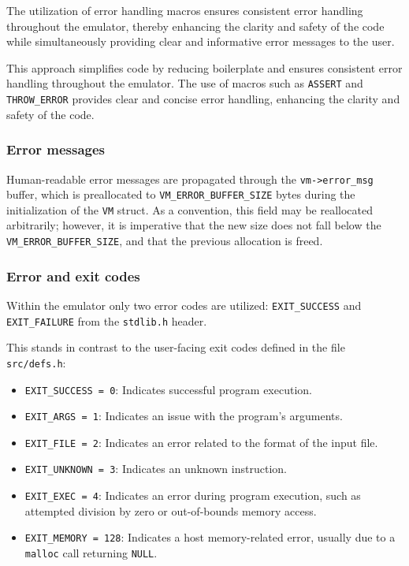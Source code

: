 \documentclass[10pt,a4paper,final]{article}
\newcommand{\code}[1]{\texttt{#1}}
\begin{document}
The utilization of error handling macros ensures consistent error handling
throughout the emulator, thereby enhancing the clarity and safety of the code
while simultaneously providing clear and informative error messages to the user.

This approach simplifies code by reducing boilerplate and ensures consistent
error handling throughout the emulator. The use of macros such as \code{ASSERT}
and \code{THROW_ERROR} provides clear and concise error handling, enhancing the
clarity and safety of the code.

\subsubsection{Error messages}
\label{sec:errormessages}

Human-readable error messages are propagated through the \code{vm->error_msg}
buffer, which is preallocated to \code{VM_ERROR_BUFFER_SIZE} bytes during the
initialization of the \code{VM} struct. As a convention, this field may be
reallocated arbitrarily; however, it is imperative that the new size does not
fall below the \code{VM_ERROR_BUFFER_SIZE}, and that the previous allocation is
freed.

\subsubsection{Error and exit codes}
\label{sec:errorcodes}

Within the emulator only two error codes are utilized: \code{EXIT_SUCCESS} and
\code{EXIT_FAILURE} from the \code{stdlib.h} header.

This stands in contrast to the user-facing exit codes defined in the file
\code{src/defs.h}:

\begin{itemize}
  \item \code{EXIT_SUCCESS = 0}: Indicates successful program execution.
  \item \code{EXIT_ARGS = 1}: Indicates an issue with the program's arguments.
  \item \code{EXIT_FILE = 2}: Indicates an error related to the format of the
    input file.
  \item \code{EXIT_UNKNOWN = 3}: Indicates an unknown instruction.
  \item \code{EXIT_EXEC = 4}: Indicates an error during program execution,
    such as attempted division by zero or out-of-bounds memory access.
  \item \code{EXIT_MEMORY = 128}: Indicates a host memory-related error,
    usually due to a \code{malloc} call returning \code{NULL}.
\end{itemize}
\end{document}
